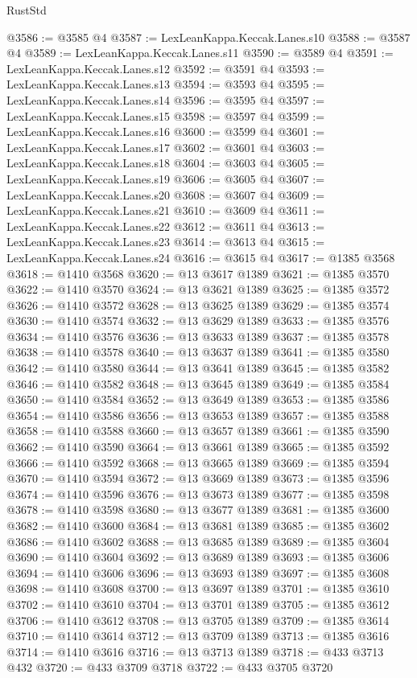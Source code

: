 \begin{lexlean}{RustStd}
\begin{coremodule}
{\begin{coremodule}
{{{{{{{{{{{{{{{{@3586 := @3585 @4
@3587 := LexLeanKappa.Keccak.Lanes.s10
@3588 := @3587 @4
@3589 := LexLeanKappa.Keccak.Lanes.s11
@3590 := @3589 @4
@3591 := LexLeanKappa.Keccak.Lanes.s12
@3592 := @3591 @4
@3593 := LexLeanKappa.Keccak.Lanes.s13
@3594 := @3593 @4
@3595 := LexLeanKappa.Keccak.Lanes.s14
@3596 := @3595 @4
@3597 := LexLeanKappa.Keccak.Lanes.s15
@3598 := @3597 @4
@3599 := LexLeanKappa.Keccak.Lanes.s16
@3600 := @3599 @4
@3601 := LexLeanKappa.Keccak.Lanes.s17
@3602 := @3601 @4
@3603 := LexLeanKappa.Keccak.Lanes.s18
@3604 := @3603 @4
@3605 := LexLeanKappa.Keccak.Lanes.s19
@3606 := @3605 @4
@3607 := LexLeanKappa.Keccak.Lanes.s20
@3608 := @3607 @4
@3609 := LexLeanKappa.Keccak.Lanes.s21
@3610 := @3609 @4
@3611 := LexLeanKappa.Keccak.Lanes.s22
@3612 := @3611 @4
@3613 := LexLeanKappa.Keccak.Lanes.s23
@3614 := @3613 @4
@3615 := LexLeanKappa.Keccak.Lanes.s24
@3616 := @3615 @4
@3617 := @1385 @3568
@3618 := @1410 @3568
@3620 := @13 @3617 @1389
@3621 := @1385 @3570
@3622 := @1410 @3570
@3624 := @13 @3621 @1389
@3625 := @1385 @3572
@3626 := @1410 @3572
@3628 := @13 @3625 @1389
@3629 := @1385 @3574
@3630 := @1410 @3574
@3632 := @13 @3629 @1389
@3633 := @1385 @3576
@3634 := @1410 @3576
@3636 := @13 @3633 @1389
@3637 := @1385 @3578
@3638 := @1410 @3578
@3640 := @13 @3637 @1389
@3641 := @1385 @3580
@3642 := @1410 @3580
@3644 := @13 @3641 @1389
@3645 := @1385 @3582
@3646 := @1410 @3582
@3648 := @13 @3645 @1389
@3649 := @1385 @3584
@3650 := @1410 @3584
@3652 := @13 @3649 @1389
@3653 := @1385 @3586
@3654 := @1410 @3586
@3656 := @13 @3653 @1389
@3657 := @1385 @3588
@3658 := @1410 @3588
@3660 := @13 @3657 @1389
@3661 := @1385 @3590
@3662 := @1410 @3590
@3664 := @13 @3661 @1389
@3665 := @1385 @3592
@3666 := @1410 @3592
@3668 := @13 @3665 @1389
@3669 := @1385 @3594
@3670 := @1410 @3594
@3672 := @13 @3669 @1389
@3673 := @1385 @3596
@3674 := @1410 @3596
@3676 := @13 @3673 @1389
@3677 := @1385 @3598
@3678 := @1410 @3598
@3680 := @13 @3677 @1389
@3681 := @1385 @3600
@3682 := @1410 @3600
@3684 := @13 @3681 @1389
@3685 := @1385 @3602
@3686 := @1410 @3602
@3688 := @13 @3685 @1389
@3689 := @1385 @3604
@3690 := @1410 @3604
@3692 := @13 @3689 @1389
@3693 := @1385 @3606
@3694 := @1410 @3606
@3696 := @13 @3693 @1389
@3697 := @1385 @3608
@3698 := @1410 @3608
@3700 := @13 @3697 @1389
@3701 := @1385 @3610
@3702 := @1410 @3610
@3704 := @13 @3701 @1389
@3705 := @1385 @3612
@3706 := @1410 @3612
@3708 := @13 @3705 @1389
@3709 := @1385 @3614
@3710 := @1410 @3614
@3712 := @13 @3709 @1389
@3713 := @1385 @3616
@3714 := @1410 @3616
@3716 := @13 @3713 @1389
@3718 := @433 @3713 @432
@3720 := @433 @3709 @3718
@3722 := @433 @3705 @3720
}}}}}}}}}}}}}}}}
\end{coremodule}}
\end{coremodule}
\end{lexlean}
